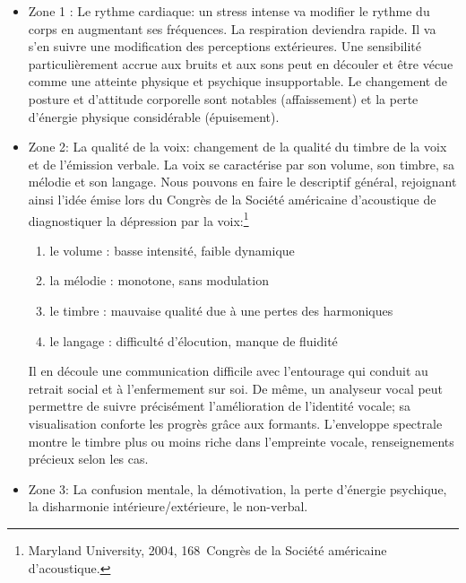 \begin{itemize}
  	\item Zone 1 :  Le rythme cardiaque: un stress intense va modifier le rythme
  du corps en augmentant ses fréquences. La respiration deviendra
  rapide. Il va s'en suivre une modification des perceptions
  extérieures. Une sensibilité particulièrement accrue aux bruits et
  aux sons peut en découler et être vécue comme une
  atteinte physique et psychique insupportable.
  Le changement de posture et d'attitude corporelle sont
notables (affaissement) et la perte d'énergie physique considérable (épuisement).
	\item Zone 2: La qualité de la voix: changement de la qualité du timbre de la
 voix et de l'émission verbale.	
  La voix se caractérise par son volume, son timbre, sa mélodie et son
  langage. Nous pouvons en faire le
        descriptif général, rejoignant ainsi l'idée émise lors du Congrès de la Société
        américaine d'acoustique \autocite{le_service_metronews}
        de diagnostiquer la
        dépression par la voix:\footnote{Maryland University, 2004, 168\ieme\ Congrès de la Société
américaine d'acoustique.} 
          
 	\begin{enumerate}
 		\item le volume : basse intensité, faible dynamique
 		\item la mélodie : monotone, sans modulation
 		\item le timbre : mauvaise qualité due à une pertes des harmoniques
 		\item le langage : difficulté d'élocution, manque de fluidité
 	\end{enumerate}
        Il en découle une communication difficile avec l'entourage qui
        conduit au retrait social et à l'enfermement sur soi.
De même, un analyseur vocal peut permettre de suivre précisément l'amélioration de
l'identité vocale; sa visualisation conforte les progrès grâce aux
formants. L'enveloppe spectrale montre le timbre plus ou moins riche
dans l'empreinte vocale, renseignements précieux selon les cas.
        
	\item Zone 3: La confusion mentale, la démotivation, la perte d'énergie
psychique, la disharmonie intérieure/extérieure, le non-verbal.
\end{itemize}

